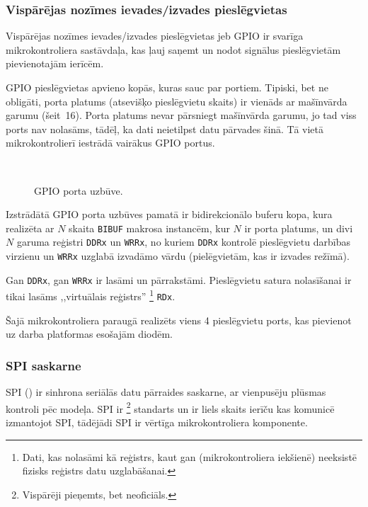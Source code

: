 	\subsubsection{Vispārējas nozīmes ievades/izvades pieslēgvietas}
		Vispārējas nozīmes ievades/izvades pieslēgvietas jeb GPIO ir svarīga
		mikrokontroliera sastāvdaļa, kas ļauj saņemt un nodot signālus
		pieslēgvietām pievienotajām ierīcēm.
		
		GPIO pieslēgvietas apvieno kopās, kuras sauc par portiem. Tipiski, bet
		ne obligāti, porta platums (atsevišķo pieslēgvietu skaits) ir vienāds
		ar mašīnvārda garumu (šeit~16). Porta platums nevar pārsniegt
		mašīnvārda garumu, jo tad viss ports nav nolasāms, tādēļ, ka dati
		neietilpst datu pārvades šinā. Tā vietā mikrokontrolierī iestrādā
		vairākus GPIO portus.
		
		\begin{figure}[th]
			\centering
			\def\svgwidth{0.9\textwidth}
			{\ttfamily\footnotesize}\\
			\caption{GPIO porta uzbūve.}
			\label{fig:gpio}
		\end{figure}
		
		Izstrādātā GPIO porta uzbūves pamatā ir
		bidirekcionālo buferu kopa, kura realizēta ar $N$ skaita
		\texttt{BIBUF} makrosa instancēm, kur $N$ ir porta platums,
		un divi $N$ garuma reģistri \texttt{DDRx} un \texttt{WRRx},
		no kuriem \texttt{DDRx} kontrolē pieslēgvietu darbības virzienu un
		\texttt{WRRx} uzglabā izvadāmo vārdu (pielēgvietām, kas ir izvades režīmā).
		
		Gan \texttt{DDRx}, gan \texttt{WRRx} ir lasāmi un pārrakstāmi.
		Pieslēgvietu satura nolasīšanai ir tikai lasāms ,,virtuālais reģistrs''%
		\footnote{Dati, kas nolasāmi kā reģistrs, kaut gan (mikrokontroliera iekšienē)
			neeksistē fizisks reģistrs datu uzglabāšanai.}
		\texttt{RDx}.
	
	Šajā mikrokontroliera paraugā realizēts viens 4 pieslēgvietu ports, kas
	pievienot uz darba platformas esošajām diodēm.
	
	\clearpage %
	\subsubsection{SPI saskarne} \label{sec:spi}
		SPI () ir sinhrona seriālās
		datu pārraides saskarne, ar vienpusēju plūsmas kontroli pēc
		 modeļa.
		SPI ir %
		\footnote{Vispārēji pieņemts, bet neoficiāls.}
		standarts un ir liels skaits ierīču kas komunicē izmantojot SPI,
		tādējādi SPI ir vērtīga mikrokontroliera komponente.
		
